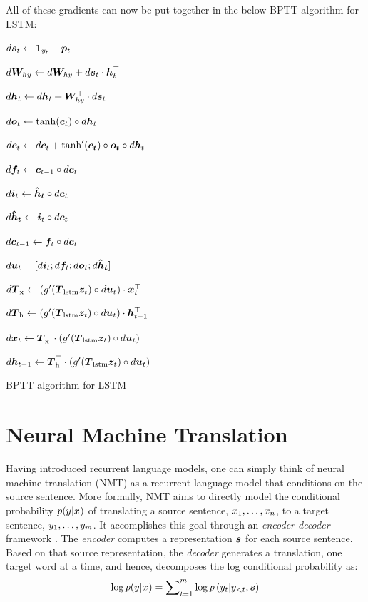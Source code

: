 All of these gradients can now be put together in the below BPTT algorithm for LSTM:
\begin{algorithm}
\label{a:lstm}
{
$d\bm{s}_{t} \leftarrow \bm{1}_{y_t} - \bm{p}_{t}$

$d\bm{W}_{hy} \leftarrow d\bm{W}_{hy} + d\bm{s}_{t} \cdot \bm{h}_{t}^\top$

$d\bm{h}_{t} \leftarrow d\bm{h}_{t} + \bm{W}_{hy}^\top \cdot d\bm{s}_{t}$

$d\bm{o}_{t} \leftarrow \tanh(\bm{c}_{t}) \circ d\bm{h}_{t}$

$d\bm{c}_{t} \leftarrow d\bm{c}_{t} + \tanh'(\bm{\bm{c}_{t}}) \circ \bm{\bm{o}_{t}} \circ d\bm{h}_{t}$ 

$d\bm{f}_{t} \leftarrow \bm{c}_{t-1} \circ d\bm{c}_{t}$

$d\bm{i}_{t} \leftarrow \mbox{\boldmath{$\hat{h}_t$}} \circ d\bm{c}_{t}$

$d\mbox{\boldmath{$\hat{h}_t$}} \leftarrow \bm{i}_{t} \circ d\bm{c}_{t}$

$d\bm{c}_{t-1} \leftarrow \bm{f}_{t} \circ d\bm{c}_{t}$ 

$d\bm{u}_t = [d\bm{i}_{t}; d\bm{f}_{t}; d\bm{o}_{t}; d\mbox{\boldmath{$\hat{h}_t$}}]$

$d\mbox{\boldmath{$T$}}_{\text{x}} \leftarrow \left(g'(\mbox{\boldmath{$T$}}_{\text{lstm}} \bm{z}_{t}) \circ d\bm{u}_t\right) \cdot \bm{x}_{t}^\top$

$d\mbox{\boldmath{$T$}}_{\text{h}} \leftarrow  \left(g'(\mbox{\boldmath{$T$}}_{\text{lstm}} \bm{z}_{t}) \circ d\bm{u}_t\right) \cdot \bm{h}_{t-1}^\top$

$d\bm{x}_{t} \leftarrow  \mbox{\boldmath{$T$}}_{\text{x}}^\top \cdot \left(g'(\mbox{\boldmath{$T$}}_{\text{lstm}} \bm{z}_{t}) \circ d\bm{u}_t\right)$

$d\bm{h}_{t-1} \leftarrow  \mbox{\boldmath{$T$}}_{\text{h}}^\top \cdot \left(g'(\mbox{\boldmath{$T$}}_{\text{lstm}} \bm{z}_{t}) \circ d\bm{u}_t\right)$
}
\caption{BPTT algorithm for LSTM}
\label{a:lstm_bptt}
\end{algorithm}

\section{Neural Machine Translation}
Having introduced recurrent language models, one can simply think of
neural machine translation (NMT) as a recurrent language model that conditions
on the source sentence. More formally, NMT aims to directly model the
conditional probability $p(y_{}|x_{})$ of translating
a source sentence, $x_{1},\ldots,x_{n}$, to a target sentence, $y_{1},\ldots,y_{m}$.
It accomplishes this goal through an {\it encoder-decoder} framework
\cite{kal13,sutskever14,cho14}. The {\it encoder} computes a representation $\mbox{\boldmath{$s$}}$
for each source sentence. Based on that source representation,
the {\it decoder} generates a translation, one target word at a time, and hence,
decomposes the log conditional probability as:
\begin{equation}
\log p(y_{}|x_{}) = \sum_{t=1}^m \nolimits \log
p\left(y_{t}|y_{<t},\mbox{\boldmath{$s$}}\right)
\label{e:s2s}
\end{equation}

